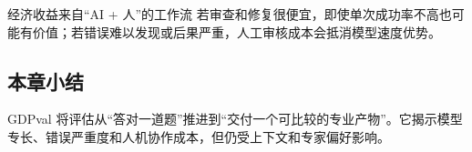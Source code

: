 \begin{importantbox}{经济收益来自“AI + 人”的工作流}
若审查和修复很便宜，即使单次成功率不高也可能有价值；若错误难以发现或后果严重，人工审核成本会抵消模型速度优势。
\end{importantbox}


\subsection{本章小结}

GDPval 将评估从“答对一道题”推进到“交付一个可比较的专业产物”。它揭示模型专长、错误严重度和人机协作成本，但仍受上下文和专家偏好影响。

